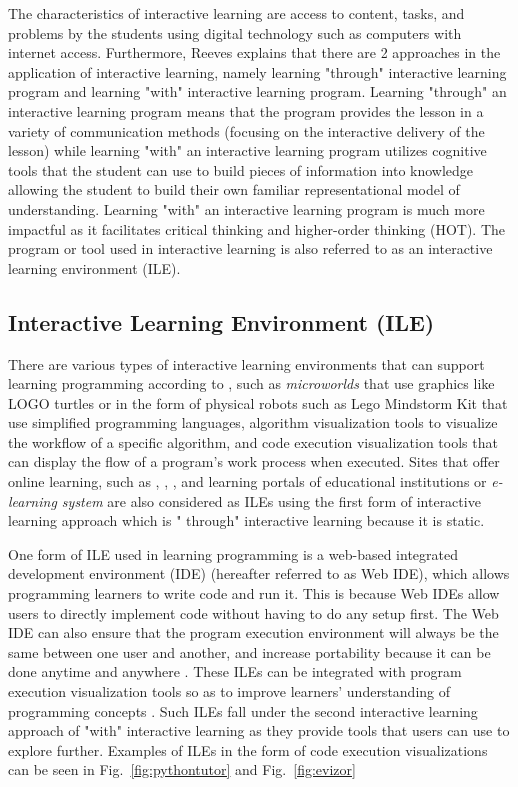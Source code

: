 \documentclass[conference]{IEEEtran}
\begin{document}
The characteristics of interactive learning \cite{reeves2012interactive} are access to content, tasks, and problems by the students using digital technology such as computers with internet access. Furthermore, Reeves \cite{reeves2012interactive} explains that there are 2 approaches in the application of interactive learning, namely learning "through" interactive learning program and learning "with" interactive learning program. Learning "through" an interactive learning program means that the program provides the lesson in a variety of communication methods (focusing on the interactive delivery of the lesson) while learning "with" an interactive learning program utilizes cognitive tools that the student can use to build pieces of information into knowledge allowing the student to build their own familiar representational model of understanding. Learning "with" an interactive learning program is much more impactful as it facilitates critical thinking and higher-order thinking (HOT). The program or tool used in interactive learning is also referred to as an interactive learning environment (ILE).

\subsection{Interactive Learning Environment (ILE)}
There are various types of interactive learning environments that can support learning programming according to \cite{moons2013pilot}, such as \textit{microworlds} that use graphics like LOGO turtles or in the form of physical robots such as Lego Mindstorm Kit that use simplified programming languages, algorithm visualization tools to visualize the workflow of a specific algorithm, and code execution visualization tools that can display the flow of a program's work process when executed. Sites that offer online learning, such as \cite{sololearn2021media}, \cite{codesaya2021media}, \cite{brilliant2021media}, and learning portals of educational institutions or \textit{e-learning system} are also considered as ILEs using the first form of interactive learning approach which is " through" interactive learning because it is static.

One form of ILE used in learning programming is a web-based integrated development environment (IDE) (hereafter referred to as Web IDE), which allows programming learners to write code and run it. This is because Web IDEs allow users to directly implement code without having to do any setup first. The Web IDE can also ensure that the program execution environment will always be the same between one user and another, and increase portability because it can be done anytime and anywhere \cite{tran2013interactive}. These ILEs can be integrated with program execution visualization tools so as to improve learners' understanding of programming concepts \cite{moons2013pilot}. Such ILEs fall under the second interactive learning approach of "with" interactive learning as they provide tools that users can use to explore further. Examples of ILEs in the form of code execution visualizations can be seen in Fig.~\ref{fig:pythontutor} and Fig.~\ref{fig:evizor}
\end{document}
